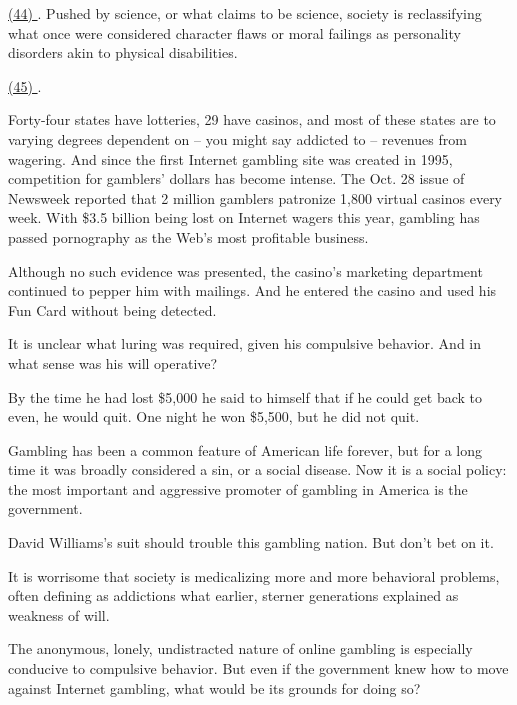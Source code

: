 \qquad \ul{(44) \qquad\qquad}. Pushed by science, or what claims to be science, society is reclassifying what once were considered character flaws or moral failings as personality disorders akin to physical disabilities.

\qquad \ul{(45) \qquad\qquad}.

\qquad Forty-four states have lotteries, 29 have casinos, and most of these states are to varying degrees dependent on -- you might say addicted to -- revenues from wagering. And since the first Internet gambling site was created in 1995, competition for gamblers’ dollars has become intense. The Oct. 28 issue of Newsweek reported that 2 million gamblers patronize 1,800 virtual casinos every week. With \$3.5 billion being lost on Internet wagers this year, gambling has passed pornography as the Web’s most profitable business.

\qquad [A] Although no such evidence was presented, the casino’s marketing department continued to pepper him with mailings. And he entered the casino and used his Fun Card without being detected.

\qquad [B] It is unclear what luring was required, given his compulsive behavior. And in what sense was his will operative?

\qquad [C] By the time he had lost \$5,000 he said to himself that if he could get back to even, he would quit. One night he won \$5,500, but he did not quit.

\qquad [D] Gambling has been a common feature of American life forever, but for a long time it was broadly considered a sin, or a social disease. Now it is a social policy: the most important and aggressive promoter of gambling in America is the government.

\qquad [E] David Williams’s suit should trouble this gambling nation. But don’t bet on it.

\qquad [F] It is worrisome that society is medicalizing more and more behavioral problems, often defining as addictions what earlier, sterner generations explained as weakness of will.

\qquad [G] The anonymous, lonely, undistracted nature of online gambling is especially conducive to compulsive behavior. But even if the government knew how to move against Internet gambling, what would be its grounds for doing so?